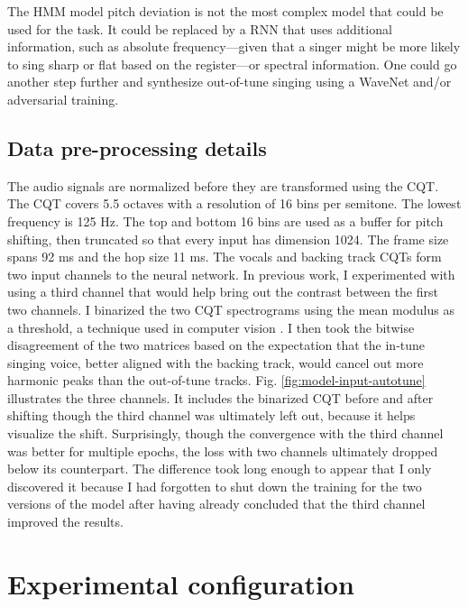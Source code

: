 The HMM model pitch deviation is not the most complex model that could be used for the task. It could be replaced by a RNN that uses additional information, such as absolute frequency---given that a singer might be more likely to sing sharp or flat based on the register---or spectral information. One could go another step further and synthesize out-of-tune singing using a WaveNet and/or adversarial training.

\subsection{Data pre-processing details}
\label{sec:data-format-autotune}
The audio signals are normalized before they are transformed using the CQT. The CQT covers 5.5 octaves with a resolution of 16 bins per semitone. The lowest frequency is 125 Hz. The top and bottom 16 bins are used as a buffer for pitch shifting, then truncated so that every input has dimension 1024. The frame size spans 92 ms and the hop size 11 ms. The vocals and backing track CQTs form two input channels to the neural network. In previous work, I experimented with using a third channel that would help bring out the contrast between the first two channels. I binarized the two CQT spectrograms using the mean modulus as a threshold, a technique used in computer vision \cite{sezgin2004survey}. I then took the bitwise disagreement of the two matrices based on the expectation that the in-tune singing voice, better aligned with the backing track, would cancel out more harmonic peaks than the out-of-tune tracks. Fig. \ref{fig:model-input-autotune} illustrates the three channels. It includes the binarized CQT before and after shifting though the third channel was ultimately left out, because it helps visualize the shift. Surprisingly, though the convergence with the third channel was better for multiple epochs, the loss with two channels ultimately dropped below its counterpart. The difference took long enough to appear that I only discovered it because I had forgotten to shut down the training for the two versions of the model after having already concluded that the third channel improved the results. 

\section{Experimental configuration}
\label{sec:experiments-autotune}
